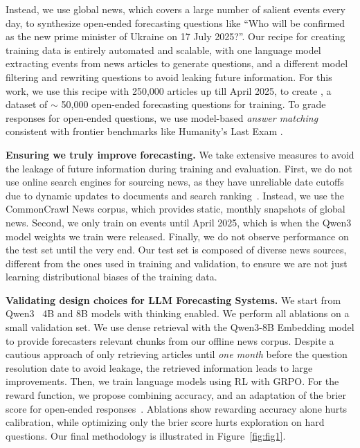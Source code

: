  Instead, we use global news, which covers a large number of salient events every day, to synthesize open-ended forecasting questions like ``Who will be confirmed as the new prime minister of Ukraine on 17 July 2025?''. Our recipe for creating training data is entirely automated and scalable, with one language model extracting events from news articles to generate questions, and a different model filtering and rewriting questions to avoid leaking future information. For this work, we use this recipe with 250,000 articles up till April 2025, to create \ourdataset, a dataset of $\sim$ 50,000 open-ended forecasting questions for training. To grade responses for open-ended questions, we use model-based \emph{answer matching}~\citep{chandak2025answer} consistent with frontier benchmarks like Humanity's Last Exam \citep{phan2025humanity}. \vspace{0.15cm}

\textbf{Ensuring we truly improve forecasting.} We take extensive measures to avoid the leakage of future information during training and evaluation. First, we do not use online search engines for sourcing news, as they have unreliable date cutoffs due to dynamic updates to documents and search ranking~\citep{paleka2025pitfalls}. Instead, we use the CommonCrawl News corpus, which provides static, monthly snapshots of global news. Second, we only train on events until April 2025, which is when the Qwen3 model weights we train were released. Finally, we do not observe performance on the test set until the very end. Our test set is composed of diverse news sources, different from the ones used in training and validation, to ensure we are not just learning distributional biases of the training data.\vspace{0.15cm}

\textbf{Validating design choices for LLM Forecasting Systems.} We start from Qwen3~\citep{yang2025qwen3technicalreport} 4B and 8B models with thinking enabled. We perform all ablations on a small validation set. We use dense retrieval with the Qwen3-8B Embedding model to provide forecasters relevant chunks from our offline news corpus. Despite a cautious approach of only retrieving articles until \emph{one month} before the question resolution date to avoid leakage, the retrieved information leads to large improvements. Then, we train language models using RL with GRPO. For the reward function, we propose combining accuracy, and an adaptation of the brier score for open-ended responses~\citep{damani2025beyond}. Ablations show rewarding accuracy alone hurts calibration, while optimizing only the brier score hurts exploration on hard questions. Our final methodology is illustrated in Figure~\ref{fig:fig1}. \vspace{0.15cm}

